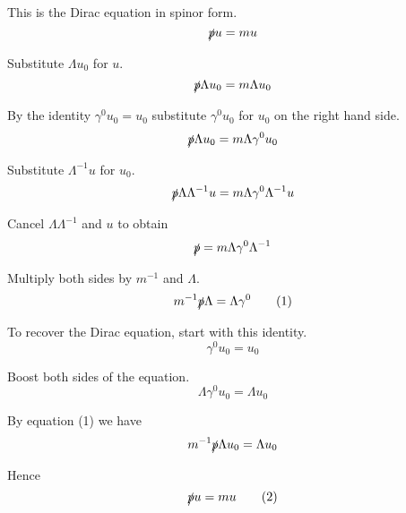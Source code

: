 This is the Dirac equation in spinor form.
\begin{equation*}
\slashed pu=mu
\end{equation*}

Substitute $\Lambda u_0$ for $u$.
\begin{equation*}
\slashed p\Lambda u_0=m\Lambda u_0
\end{equation*}

By the identity $\gamma^0u_0=u_0$ substitute $\gamma^0u_0$ for $u_0$ on the right hand side.
\begin{equation*}
\slashed p\Lambda u_0=m\Lambda\gamma^0u_0
\end{equation*}

Substitute $\Lambda^{-1}u$ for $u_0$.
\begin{equation*}
\slashed p\Lambda\Lambda^{-1}u=m\Lambda\gamma^0\Lambda^{-1}u
\end{equation*}

Cancel $\Lambda\Lambda^{-1}$ and $u$ to obtain
\begin{equation*}
\slashed p=m\Lambda\gamma^0\Lambda^{-1}
\end{equation*}

Multiply both sides by $m^{-1}$ and $\Lambda$.
\begin{equation*}
m^{-1}\slashed p\Lambda=\Lambda\gamma^0
\tag{1}
\end{equation*}

To recover the Dirac equation, start with this identity.
\begin{equation*}
\gamma^0u_0=u_0
\end{equation*}

Boost both sides of the equation.
\begin{equation*}
\Lambda\gamma^0u_0=\Lambda u_0
\end{equation*}

By equation (1) we have
\begin{equation*}
m^{-1}\slashed p\Lambda u_0=\Lambda u_0
\end{equation*}

Hence
\begin{equation*}
\slashed pu=mu
\tag{2}
\end{equation*}


